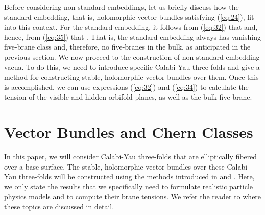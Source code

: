 \documentclass[a4paper,12pt]{article}
\numberwithin{equation}{section}
\theoremstyle{plain}
\begin{document}
Before considering non-standard embeddings, let us briefly discuss how the
standard embedding, that is, holomorphic vector bundles satisfying 
(\ref{eq:24}), fit into this context. For the standard embedding, it follows
from (\ref{eq:32}) that \coordHE{} and, hence, from
(\ref{eq:35}) that \coordHE{}. That is, the standard embedding always has
vanishing five-brane class \coordHE{} and, therefore, no five-branes in the bulk, as
anticipated in the previous section. We now proceed to the construction of
non-standard embedding vacua. To do this, we need to introduce specific
Calabi-Yau three-folds and give a method for constructing stable,
holomorphic vector bundles over them. Once this is accomplished, we can use
expressions (\ref{eq:32}) and (\ref{eq:34}) to calculate the tension of the visible
and hidden orbifold planes, as well as the bulk five-brane.


\section{Vector Bundles and Chern Classes}

In this paper, we will consider Calabi-Yau three-folds that are elliptically
fibered over a base surface. The stable, holomorphic vector
bundles over these Calabi-Yau three-folds will be constructed using the methods
introduced in \cite{FMW1,AJ,FMW2} and \cite{RD1,RD2,RD3,RD4,C}. 
Here, we only state the results that we
specifically need to formulate realistic particle physics models and to
compute their brane tensions. We refer the reader to 
\cite{RD1,RD2,RD3,RD4} where these topics are discussed in detail.
\end{document}
